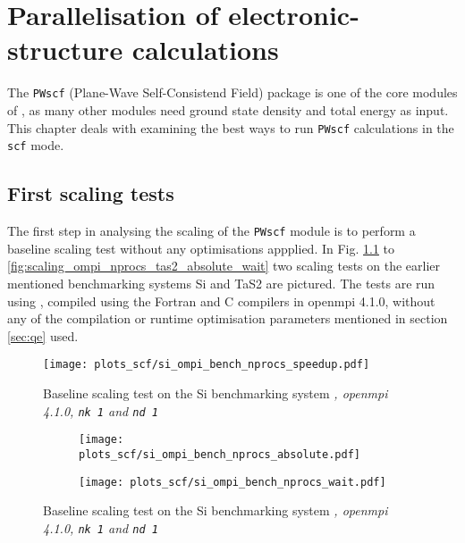 \documentclass[main.tex]{subfiles}
\begin{document}
\chapter{Parallelisation of electronic-structure calculations\label{ch:optimisation_scf}}

The \texttt{PWscf} (Plane-Wave Self-Consistend Field) package is one of the core modules of \QE, as many other modules need ground state density and total energy as input.
This chapter deals with examining the best ways to run \texttt{PWscf} calculations in the \texttt{scf} mode.

\section{First scaling tests}\label{sec:scf_first_scaling}

The first step in analysing the scaling of the \texttt{PWscf} module is to perform a baseline scaling test without any optimisations appplied. 
In Fig. \ref{fig:scaling_ompi_nprocs_si_speedup} to \ref{fig:scaling_ompi_nprocs_tas2_absolute_wait} two scaling tests on the earlier mentioned benchmarking systems Si and TaS2 are pictured. 
The tests are run using , compiled using the Fortran and C compilers in \gls{openmpi} 4.1.0, without any of the compilation or runtime optimisation parameters mentioned in section \ref{sec:qe} used.

\begin{figure}[ht!]
\centering
\texttt{[image: plots\_scf/si\_ompi\_bench\_nprocs\_speedup.pdf]}
\caption{Baseline scaling test on the Si benchmarking system \emph{, \gls{openmpi} 4.1.0, \texttt{nk 1} and \texttt{nd 1}}}
\label{fig:scaling_ompi_nprocs_si_speedup}
\end{figure}

\begin{figure}[ht!]
\begin{subfigure}[b]{0.49\textwidth}
    \centering
    \texttt{[image: plots\_scf/si\_ompi\_bench\_nprocs\_absolute.pdf]}
\end{subfigure}
\begin{subfigure}[b]{0.49\textwidth}
    \centering
    \texttt{[image: plots\_scf/si\_ompi\_bench\_nprocs\_wait.pdf]}
\end{subfigure}
\caption{Baseline scaling test on the Si benchmarking system \emph{, \gls{openmpi} 4.1.0, \texttt{nk 1} and \texttt{nd 1}}}
\label{fig:scaling_ompi_nprocs_si_absolute_wait}
\end{figure}
\end{document}
